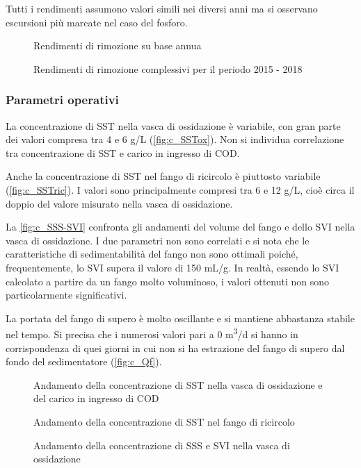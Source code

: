 Tutti i rendimenti assumono valori simili nei diversi anni ma si osservano escursioni più marcate nel caso del fosforo. 

\begin{figure}[H]
		\centering
	\caption{Rendimenti di rimozione su base annua}
	\label{fig:c_rendanni}
\end{figure}
\begin{figure}[H]
		\centering
	\caption{Rendimenti di rimozione complessivi per il periodo 2015 - 2018}
	\label{fig:c_rendtot}
\end{figure}

\subsubsection{Parametri operativi}

La concentrazione di SST nella vasca di ossidazione è variabile, con gran parte dei valori compresa tra 4 e 6 g/L (\autoref{fig:c_SSTox}). Non si individua correlazione tra concentrazione di SST e carico in ingresso di COD.

Anche la concentrazione di SST nel fango di ricircolo è piuttosto variabile (\autoref{fig:c_SSTric}). I valori sono principalmente compresi tra 6 e 12 g/L, cioè circa il doppio del valore misurato nella vasca di ossidazione.

La \autoref{fig:c_SSS-SVI} confronta gli andamenti del volume del fango e dello SVI nella vasca di ossidazione. I due parametri non sono correlati e si nota che le caratteristiche di sedimentabilità del fango non sono ottimali poiché, frequentemente, lo SVI supera il valore di 150 mL/g. In realtà, essendo lo SVI calcolato a partire da un fango molto voluminoso, i valori ottenuti non sono particolarmente significativi.

La portata del fango di supero è molto oscillante e si mantiene abbastanza stabile nel tempo. Si precisa che i numerosi valori pari a 0 m\textsuperscript{3}/d si hanno in corrispondenza di quei giorni in cui non si ha estrazione del fango di supero dal fondo del sedimentatore (\autoref{fig:c_Qf}).
\begin{figure}[H]
		\centering
	\caption{Andamento della concentrazione di SST nella vasca di ossidazione e del carico in ingresso di COD}
	\label{fig:c_SSTox}
\end{figure}
\begin{figure}[H]
		\centering
	\caption{Andamento della concentrazione di SST nel fango di ricircolo}
	\label{fig:c_SSTric}
\end{figure}
\begin{figure}[H]
		\centering
	\caption{Andamento della concentrazione di SSS e SVI nella vasca di ossidazione}
	\label{fig:c_SSS-SVI}
\end{figure}

